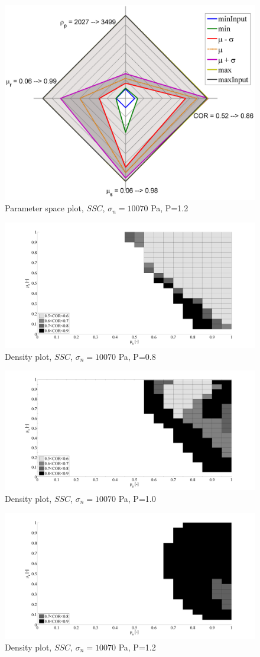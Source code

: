 \begin{figure}%
\centering 
\includegraphics[width=.48\columnwidth]{images/028radarpirker12schulze10070} 
\caption{Parameter space plot, $SSC$, $\sigma_n=10070$ Pa, P=1.2}
\label{fig:028radarpirker12schulze10070} 
\end{figure}
\begin{figure}%
\centering 
\includegraphics[width=.48\columnwidth]{images/027cloudpirker08schulze10070} 
\caption{Density plot, $SSC$, $\sigma_n=10070$ Pa, P=0.8}
\label{fig:027cloudpirker08schulze10070} 
\end{figure}
\begin{figure}%
\centering 
\includegraphics[width=.48\columnwidth]{images/025cloudpirker1schulze10070} 
\caption{Density plot, $SSC$, $\sigma_n=10070$ Pa, P=1.0}
\label{fig:025cloudpirker1schulze10070} 
\end{figure}
\begin{figure}%
\centering 
\includegraphics[width=.48\columnwidth]{images/030cloudpirker12schulze10070} 
\caption{Density plot, $SSC$, $\sigma_n=10070$ Pa, P=1.2}
\label{fig:030cloudpirker12schulze10070} 
\end{figure}

